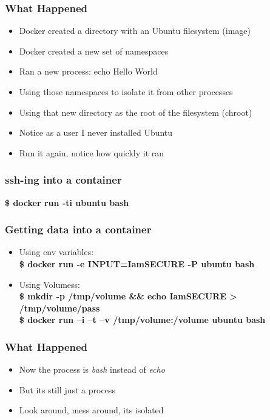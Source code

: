 \documentclass[aspectratio=169,11pt,hyperref={colorlinks=true}]{beamer}
\begin{document}
\begin{frame}
    \frametitle{What Happened}
    \begin{itemize}
        \item Docker created a directory with an Ubuntu filesystem (image)
        \item Docker created a new set of namespaces
        \item Ran a new process: echo Hello World
        \item Using those namespaces to isolate it from other processes
        \item Using that new directory as the root of the filesystem (chroot)
        \item Notice as a user I never installed Ubuntu
        \item Run it again, notice how quickly it ran
    \end{itemize}
\end{frame}

\begin{frame}
    \frametitle{ssh-ing into a container}
    \textbf{\$ docker run -ti ubuntu bash}
\end{frame}

\begin{frame}
    \frametitle{Getting data into a container}
    \begin{itemize}
        \item Using env variables: \\
           \textbf{\$ docker run -e INPUT=IamSECURE -P ubuntu bash}
       \item Using Volumess: \\
           \textbf{\$ mkdir -p /tmp/volume \&\& echo IamSECURE > /tmp/volume/pass}\\
           \textbf{\$ docker run –i –t –v /tmp/volume:/volume ubuntu bash}
    \end{itemize}
\end{frame}

\begin{frame}
    \frametitle{What Happened}
    \begin{itemize}
        \item Now the process is \textit{bash} instead of \textit{echo}
        \item But its still just a process
        \item Look around, mess around, its isolated
    \end{itemize}
\end{frame}
\end{document}
